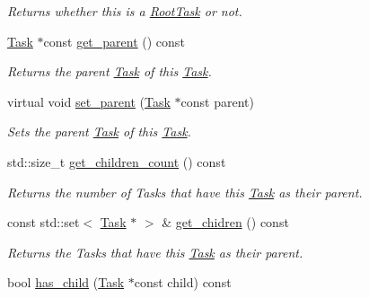 \begin{DoxyCompactItemize}
\begin{DoxyCompactList}\small\item\em Returns whether this is a \hyperlink{classsigma_1_1core_1_1tasks_1_1_root_task}{Root\-Task} or not. \end{DoxyCompactList}\item 
\hyperlink{classsigma_1_1core_1_1tasks_1_1_task}{Task} $\ast$const \hyperlink{classsigma_1_1core_1_1tasks_1_1_task_a6949e9ea07ce3738f29c39b25acb9f26}{get\-\_\-parent} () const 
\begin{DoxyCompactList}\small\item\em Returns the parent \hyperlink{classsigma_1_1core_1_1tasks_1_1_task}{Task} of this \hyperlink{classsigma_1_1core_1_1tasks_1_1_task}{Task}. \end{DoxyCompactList}\item 
virtual void \hyperlink{classsigma_1_1core_1_1tasks_1_1_task_a975655055e70f4a2228153e84ff4e725}{set\-\_\-parent} (\hyperlink{classsigma_1_1core_1_1tasks_1_1_task}{Task} $\ast$const parent)
\begin{DoxyCompactList}\small\item\em Sets the parent \hyperlink{classsigma_1_1core_1_1tasks_1_1_task}{Task} of this \hyperlink{classsigma_1_1core_1_1tasks_1_1_task}{Task}. \end{DoxyCompactList}\item 
\hypertarget{classsigma_1_1core_1_1tasks_1_1_task_a75a3b0784751a8e82b56593407ba8858}{std\-::size\-\_\-t \hyperlink{classsigma_1_1core_1_1tasks_1_1_task_a75a3b0784751a8e82b56593407ba8858}{get\-\_\-children\-\_\-count} () const }\label{classsigma_1_1core_1_1tasks_1_1_task_a75a3b0784751a8e82b56593407ba8858}

\begin{DoxyCompactList}\small\item\em Returns the number of Tasks that have this \hyperlink{classsigma_1_1core_1_1tasks_1_1_task}{Task} as their parent. \end{DoxyCompactList}\item 
\hypertarget{classsigma_1_1core_1_1tasks_1_1_task_adf1f29e8c9be557865e80d79e8ffb33f}{const std\-::set$<$ \hyperlink{classsigma_1_1core_1_1tasks_1_1_task}{Task} $\ast$ $>$ \& \hyperlink{classsigma_1_1core_1_1tasks_1_1_task_adf1f29e8c9be557865e80d79e8ffb33f}{get\-\_\-chidren} () const }\label{classsigma_1_1core_1_1tasks_1_1_task_adf1f29e8c9be557865e80d79e8ffb33f}

\begin{DoxyCompactList}\small\item\em Returns the Tasks that have this \hyperlink{classsigma_1_1core_1_1tasks_1_1_task}{Task} as their parent. \end{DoxyCompactList}\item 
\hypertarget{classsigma_1_1core_1_1tasks_1_1_task_a99e98800a473e1a05093d64853b75740}{bool \hyperlink{classsigma_1_1core_1_1tasks_1_1_task_a99e98800a473e1a05093d64853b75740}{has\-\_\-child} (\hyperlink{classsigma_1_1core_1_1tasks_1_1_task}{Task} $\ast$const child) const }\label{classsigma_1_1core_1_1tasks_1_1_task_a99e98800a473e1a05093d64853b75740}


\end{DoxyCompactItemize}
